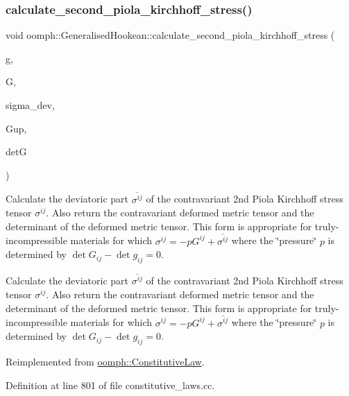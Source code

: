 \subsubsection{\texorpdfstring{calculate\+\_\+second\+\_\+piola\+\_\+kirchhoff\+\_\+stress()}{calculate\_second\_piola\_kirchhoff\_stress()}\hspace{0.1cm}{\footnotesize\ttfamily [2/3]}}
{\footnotesize\ttfamily void oomph\+::\+Generalised\+Hookean\+::calculate\+\_\+second\+\_\+piola\+\_\+kirchhoff\+\_\+stress (\begin{DoxyParamCaption}\item[{const \hyperlink{classoomph_1_1DenseMatrix}{Dense\+Matrix}$<$ double $>$ \&}]{g,  }\item[{const \hyperlink{classoomph_1_1DenseMatrix}{Dense\+Matrix}$<$ double $>$ \&}]{G,  }\item[{\hyperlink{classoomph_1_1DenseMatrix}{Dense\+Matrix}$<$ double $>$ \&}]{sigma\+\_\+dev,  }\item[{\hyperlink{classoomph_1_1DenseMatrix}{Dense\+Matrix}$<$ double $>$ \&}]{Gup,  }\item[{double \&}]{detG }\end{DoxyParamCaption})\hspace{0.3cm}{\ttfamily [virtual]}}



Calculate the deviatoric part $ \overline{ \sigma^{ij}}$ of the contravariant 2nd Piola Kirchhoff stress tensor $ \sigma^{ij}$. Also return the contravariant deformed metric tensor and the determinant of the deformed metric tensor. This form is appropriate for truly-\/incompressible materials for which $ \sigma^{ij} = - p G^{ij} +\overline{ \sigma^{ij}} $ where the \char`\"{}pressure\char`\"{} $ p $ is determined by $ \det G_{ij} - \det g_{ij} = 0 $. 

Calculate the deviatoric part $ \overline{ \sigma^{ij}}$ of the contravariant 2nd Piola Kirchhoff stress tensor $ \sigma^{ij}$. Also return the contravariant deformed metric tensor and the determinant of the deformed metric tensor. This form is appropriate for truly-\/incompressible materials for which $ \sigma^{ij} = - p G^{ij} +\overline{ \sigma^{ij}} $ where the \char`\"{}pressure\char`\"{} $ p $ is determined by $ \det G_{ij} - \det g_{ij} = 0 $. 

Reimplemented from \hyperlink{classoomph_1_1ConstitutiveLaw_ac8178b1b7cd7e6a64942dba9e0997b30}{oomph\+::\+Constitutive\+Law}.



Definition at line 801 of file constitutive\+\_\+laws.\+cc.



